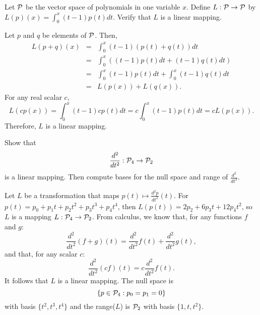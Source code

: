 \documentclass{ximera}
\begin{document}
\begin{exercise} \label{c7.2.6}
Let ${\cal P}$ be the vector space of polynomials in one variable
$x$.  Define $L:{\cal P}\to {\cal P}$ by $L(p)(x)=\int_0^x(t-1)p(t)dt$.
Verify that $L$ is a linear mapping.

\begin{solution}

Let $p$ and $q$ be elements of ${\cal P}$.  Then,
\[ \begin{array}{rcl}
L(p + q)(x) & = & \int_0^x(t - 1)(p(t) + q(t))dt \\
& = & \int_0^x((t - 1)p(t)dt + (t - 1)q(t)dt) \\
& = & \int_0^x(t - 1)p(t)dt + \int_0^x(t - 1)q(t)dt \\
& = & L(p(x)) + L(q(x)). \end{array} \]
For any real scalar $c$,
\[ L(cp(x)) = \int_0^x(t - 1)cp(t)dt = c\int_0^x(t - 1)p(t)dt
= cL(p(x)). \]
Therefore, $L$ is a linear mapping.





\end{solution}
\end{exercise}

\AEXER

\begin{exercise}  \label{A8.1.1}
Show that
\[
\frac{d^2}{dt^2}:{\cal P}_4\to{\cal P}_2
\]
is a linear mapping.  Then compute bases for the null space  
and range of $\frac{d^2}{dt^2}$.

\begin{solution}

Let $L$ be a transformation that maps $p(t) \mapsto
\frac{d^2p}{dt^2}(t)$.  For $p(t) =  p_0 + p_1t + p_2t^2 + p_3t^3+p_4t^4$, then
$L(p(t)) = 2p_2 + 6p_3t + 12p_4t^2$, so $L$ is 
a mapping $L:{\cal P}_4 \rightarrow {\cal P}_2$.  From calculus, we
know that, for any functions $f$ and $g$:
\[ 
\frac{d^2}{dt^2}(f + g)(t) = \frac{d^2}{dt^2}f(t) + \frac{d^2}{dt^2}g(t), 
\]
and that, for any scalar $c$:
\[ 
\frac{d^2}{dt^2}(cf)(t) = c\frac{d^2}{dt^2}f(t). 
\]
It follows that $L$ is a linear mapping.  The null space is
\[
\{p\in  {\cal P}_4: p_0=p_1=0\} 
\]
with basis $\{t^2,t^3,t^4\}$ and the range($L$) is ${\cal P}_2$ with basis $\{1,t,t^2\}$.
\end{solution}
\end{exercise}
\end{document}
